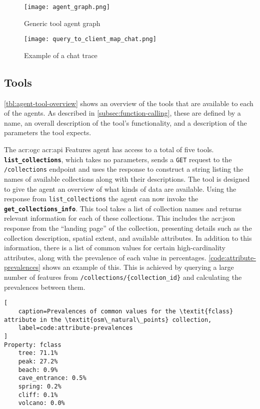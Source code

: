 \begin{figure}[h]
    \centering
    \texttt{[image: agent\_graph.png]}
    \caption{Generic tool agent graph}
    \label{fig:tool-agent-graph}
\end{figure}

\begin{figure}
    \centering
    \texttt{[image: query\_to\_client\_map\_chat.png]}
    \caption{Example of a chat trace}
    \label{fig:chat-trace-example}
\end{figure}


\subsection{Tools}
\label{subsec:tools}

\autoref{tbl:agent-tool-overview} shows an overview of the tools that are available to each of the agents. As described in \autoref{subsec:function-calling}, these are defined by a name, an overall description of the tool's functionality, and a description of the parameters the tool expects.

The \acrshort{acr:ogc} \acrshort{acr:api} Features agent has access to a total of five tools. \textbf{\texttt{list\_collections}}, which takes no parameters, sends a \texttt{GET} request to the \texttt{/collections} endpoint and uses the response to construct a string listing the names of available collections along with their descriptions. The tool is designed to give the agent an overview of what kinds of data are available. Using the response from \texttt{list\_collections} the agent can now invoke the \textbf{\texttt{get\_collections\_info}}. This tool takes a list of collection names and returns relevant information for each of these collections. This includes the \acrshort{acr:json} response from the \enquote{landing page} of the collection, presenting details such as the collection description, spatial extent, and available attributes. In addition to this information, there is a list of common values for certain high-cardinality attributes, along with the prevalence of each value in percentages. \autoref{code:attribute-prevalences} shows an example of this. This is achieved by querying a large number of features from \texttt{/collections/\{collection\_id\}} and calculating the prevalences between them.

\begin{lstlisting}[
    caption=Prevalences of common values for the \textit{fclass} attribute in the \textit{osm\_natural\_points} collection,
    label=code:attribute-prevalences
]
Property: fclass
    tree: 71.1%
    peak: 27.2%
    beach: 0.9%
    cave_entrance: 0.5%
    spring: 0.2%
    cliff: 0.1%
    volcano: 0.0%
\end{lstlisting}

